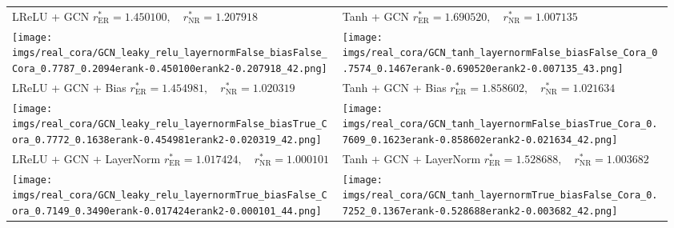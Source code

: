     \begin{tabular}{p{0.48\linewidth}|p{0.48\linewidth}}
        \toprule
        \makecell[c]{LReLU + GCN \\ $r^*_\mathrm{ER}=1.450100, \quad r^*_\mathrm{NR}=1.207918$} & \makecell[c]{Tanh + GCN \\ $r^*_\mathrm{ER}=1.690520, \quad r^*_\mathrm{NR}=1.007135$}\\ 
        \hspace{30pt}\texttt{[image: imgs/real\_cora/GCN\_leaky\_relu\_layernormFalse\_biasFalse\_Cora\_0.7787\_0.2094erank-0.450100erank2-0.207918\_42.png]} & \hspace{30pt}\texttt{[image: imgs/real\_cora/GCN\_tanh\_layernormFalse\_biasFalse\_Cora\_0.7574\_0.1467erank-0.690520erank2-0.007135\_43.png]}\\
        \midrule
        \makecell[c]{LReLU + GCN + Bias \\ $r^*_\mathrm{ER}=1.454981, \quad r^*_\mathrm{NR}=1.020319$} & \makecell[c]{Tanh + GCN + Bias \\ $r^*_\mathrm{ER}=1.858602, \quad r^*_\mathrm{NR}=1.021634$}\\
        \hspace{30pt}\texttt{[image: imgs/real\_cora/GCN\_leaky\_relu\_layernormFalse\_biasTrue\_Cora\_0.7772\_0.1638erank-0.454981erank2-0.020319\_42.png]} & \hspace{30pt}\texttt{[image: imgs/real\_cora/GCN\_tanh\_layernormFalse\_biasTrue\_Cora\_0.7609\_0.1623erank-0.858602erank2-0.021634\_42.png]}\\
        \midrule
        \makecell[c]{LReLU + GCN + LayerNorm \\ $r^*_\mathrm{ER}=1.017424, \quad r^*_\mathrm{NR}=1.000101$} & \makecell[c]{Tanh + GCN + LayerNorm \\ $r^*_\mathrm{ER}=1.528688, \quad r^*_\mathrm{NR}=1.003682$}\\
        \hspace{30pt}\texttt{[image: imgs/real\_cora/GCN\_leaky\_relu\_layernormTrue\_biasFalse\_Cora\_0.7149\_0.3490erank-0.017424erank2-0.000101\_44.png]} & \hspace{30pt}\texttt{[image: imgs/real\_cora/GCN\_tanh\_layernormTrue\_biasFalse\_Cora\_0.7252\_0.1367erank-0.528688erank2-0.003682\_42.png]}\\

\end{tabular}
